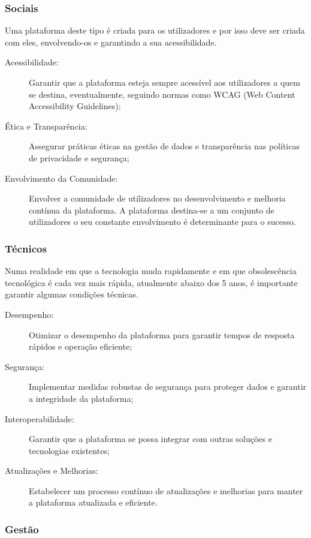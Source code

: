 \subsubsection{Sociais}

Uma plataforma deste tipo é criada para os utilizadores e por isso deve ser criada com eles, envolvendo-os e garantindo a sua
acessibilidade. 

\begin{description}
    \item[Acessibilidade:] Garantir que a plataforma esteja sempre acessível aos 
    utilizadores a quem se destina, eventualmente, seguindo normas como WCAG (Web Content Accessibility Guidelines);
    \item[Ética e Transparência:] Assegurar práticas éticas na gestão de dados e transparência nas políticas de privacidade 
    e segurança;
    \item[Envolvimento da Comunidade:] Envolver a comunidade de utilizadores no desenvolvimento e melhoria contínua da plataforma. 
    A plataforma destina-se a um conjunto de utilizadores o seu constante envolvimento é determinante para o sucesso.
\end{description}

\subsubsection{Técnicos}

Numa realidade em que a tecnologia muda rapidamente e em que obsolescência tecnológica é cada vez mais rápida, atualmente abaixo 
dos 5 anos, é importante garantir algumas condições técnicas.

\begin{description}
    \item[Desempenho:] Otimizar o desempenho da plataforma para garantir tempos de resposta rápidos e operação eficiente;
    \item[Segurança:] Implementar medidas robustas de segurança para proteger dados e garantir a integridade da plataforma;
    \item[Interoperabilidade:] Garantir que a plataforma se possa integrar com outras soluções e tecnologias existentes;
    \item[Atualizações e Melhorias:] Estabelecer um processo contínuo de atualizações e melhorias para manter a plataforma 
    atualizada e eficiente.
\end{description}

\subsubsection{Gestão}

